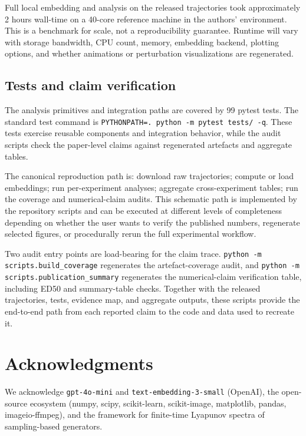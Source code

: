 \documentclass{article}
\theoremstyle{plain}
\theoremstyle{definition}
\begin{document}
Full local embedding and analysis on the released trajectories took approximately 2 hours wall-time on a 40-core reference machine in the authors' environment. This is a benchmark for scale, not a reproducibility guarantee. Runtime will vary with storage bandwidth, CPU count, memory, embedding backend, plotting options, and whether animations or perturbation visualizations are regenerated.

\subsection{Tests and claim verification}

The analysis primitives and integration paths are covered by 99 pytest tests. The standard test command is \texttt{PYTHONPATH=. python -m pytest tests/ -q}. These tests exercise reusable components and integration behavior, while the audit scripts check the paper-level claims against regenerated artefacts and aggregate tables.

The canonical reproduction path is: download raw trajectories; compute or load embeddings; run per-experiment analyses; aggregate cross-experiment tables; run the coverage and numerical-claim audits. This schematic path is implemented by the repository scripts and can be executed at different levels of completeness depending on whether the user wants to verify the published numbers, regenerate selected figures, or procedurally rerun the full experimental workflow.

Two audit entry points are load-bearing for the claim trace. \texttt{python -m scripts.build\_coverage} regenerates the artefact-coverage audit, and \texttt{python -m scripts.publication\_summary} regenerates the numerical-claim verification table, including ED50 and summary-table checks. Together with the released trajectories, tests, evidence map, and aggregate outputs, these scripts provide the end-to-end path from each reported claim to the code and data used to recreate it.

\section{Acknowledgments}

We acknowledge \texttt{gpt-4o-mini} and \texttt{text-embedding-3-small} (OpenAI),
the open-source ecosystem (numpy, scipy, scikit-learn, scikit-image,
matplotlib, pandas, imageio-ffmpeg), and the \citet{arxiv260419740}
framework for finite-time Lyapunov spectra of
sampling-based generators.
\end{document}
